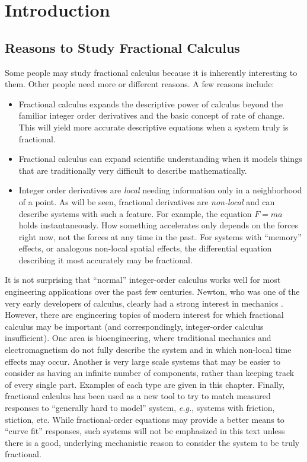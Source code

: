 \chapter{Introduction}

\section{Reasons to Study Fractional Calculus}
Some people may study fractional calculus because it is inherently interesting to them. Other people need more or different reasons. A few reasons include:
\begin{itemize}

  \item Fractional calculus expands the descriptive power of calculus beyond the
	familiar integer order derivatives and the basic concept of rate of change.
	This will yield more accurate descriptive equations when a system truly is
	fractional.

  \item Fractional calculus can expand scientific understanding when it models
	things that are traditionally very difficult to describe mathematically.

  \item Integer order derivatives are \emph{local} needing information only in a
	neighborhood of a point. As will be seen, fractional derivatives are
	\emph{non-local} and can describe systems with such a feature. For example,
	the equation $F=ma$ holds instantaneously. How something accelerates only
	depends on the forces right now, not the forces at any time in the past. For
	systems with ``memory'' effects, or analogous non-local spatial effects, the
	differential equation describing it most accurately may be fractional.  

\end{itemize}

It is not surprising that ``normal'' integer-order calculus works well for most
engineering applications over the past few centuries. Newton, who was one of the
very early developers of calculus, clearly had a strong interest in mechanics
\cite{principia}. However, there are engineering topics of modern interest for
which fractional calculus may be important (and correspondingly, integer-order
calculus insufficient). One area is bioengineering, where traditional mechanics
and electromagnetism do not fully describe the system and in which non-local
time effects may occur. Another is very large scale systems that may be easier
to consider as having an infinite number of components, rather than keeping
track of every single part. Examples of each type are given in this chapter.
Finally, fractional calculus has been used as a new tool to try to match
measured responses to ``generally hard to model'' system, \textit{e.g.}, systems
with friction, stiction, etc. While fractional-order equations may provide a
better means to ``curve fit'' responses, such systems will not be emphasized in
this text unless there is a good, underlying mechanistic reason to consider the
system to be truly fractional. 

